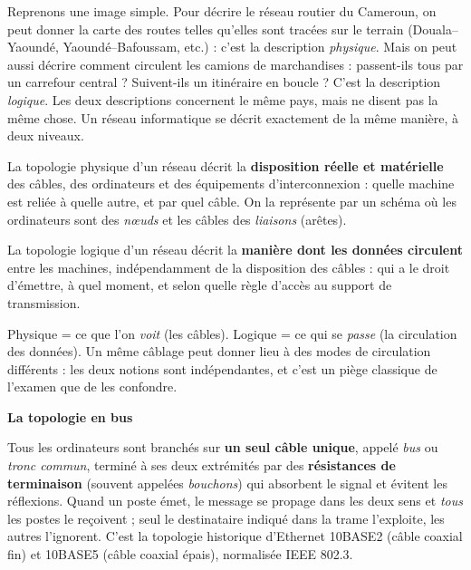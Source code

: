 \documentclass[11pt]{article}
\newcommand{\cle}[1]{{\popxbold\color{popdark}#1}}
\newcounter{popsec}
\newcounter{popsub}
\newcommand{\courssub}[1]{%
  \stepcounter{popsub}%
  \par\vspace{9pt}\noindent{\popxbold\fontsize{11.5}{13}\selectfont\color{popink}{\color{poporange}\thepopsec.\thepopsub}\hspace{6pt}#1}\par\nopagebreak\vspace{4pt}
}
\begin{document}
Reprenons une image simple. Pour décrire le réseau routier du Cameroun, on peut donner la carte des routes telles qu'elles sont tracées sur le terrain (Douala--Yaoundé, Yaoundé--Bafoussam, etc.) : c'est la description \emph{physique}. Mais on peut aussi décrire comment circulent les camions de marchandises : passent-ils tous par un carrefour central ? Suivent-ils un itinéraire en boucle ? C'est la description \emph{logique}. Les deux descriptions concernent le même pays, mais ne disent pas la même chose. Un réseau informatique se décrit exactement de la même manière, à deux niveaux.

\begin{definition}
La \cle{topologie physique} d'un réseau décrit la \textbf{disposition réelle et matérielle} des câbles, des ordinateurs et des équipements d'interconnexion : quelle machine est reliée à quelle autre, et par quel câble. On la représente par un schéma où les ordinateurs sont des \emph{nœuds} et les câbles des \emph{liaisons} (arêtes).
\end{definition}

\begin{definition}
La \cle{topologie logique} d'un réseau décrit la \textbf{manière dont les données circulent} entre les machines, indépendamment de la disposition des câbles : qui a le droit d'émettre, à quel moment, et selon quelle règle d'accès au support de transmission.
\end{definition}

\begin{aretenir}
Physique = ce que l'on \emph{voit} (les câbles). Logique = ce qui se \emph{passe} (la circulation des données). Un même câblage peut donner lieu à des modes de circulation différents : les deux notions sont indépendantes, et c'est un piège classique de l'examen que de les confondre.
\end{aretenir}

\courssub{Les quatre topologies physiques}

\textbf{La topologie en bus}\par
Tous les ordinateurs sont branchés sur \textbf{un seul câble unique}, appelé \emph{bus} ou \emph{tronc commun}, terminé à ses deux extrémités par des \textbf{résistances de terminaison} (souvent appelées \emph{bouchons}) qui absorbent le signal et évitent les réflexions. Quand un poste émet, le message se propage dans les deux sens et \emph{tous} les postes le reçoivent ; seul le destinataire indiqué dans la trame l'exploite, les autres l'ignorent. C'est la topologie historique d'Ethernet 10BASE2 (câble coaxial fin) et 10BASE5 (câble coaxial épais), normalisée IEEE 802.3.
\end{document}
